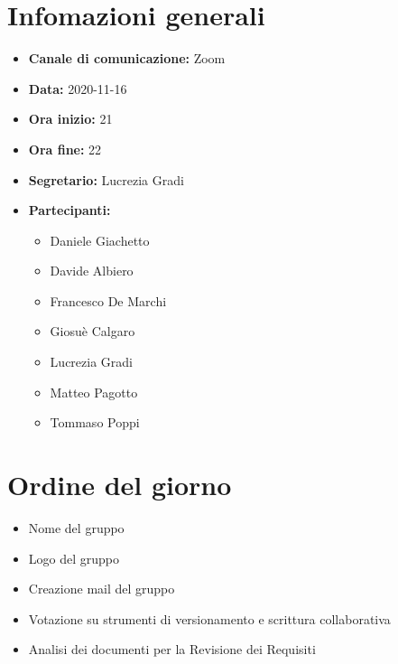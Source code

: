 \section{Infomazioni generali}

\begin{itemize}

	\item \textbf{Canale di comunicazione:} Zoom
	
	\item \textbf{Data:} 2020-11-16
	
	\item \textbf{Ora inizio:} 21
	
	\item \textbf{Ora fine:} 22
	
	\item \textbf{Segretario:} Lucrezia Gradi
	
	\item \textbf{Partecipanti:}
	
		\begin{itemize}
		
			\item Daniele Giachetto
			\item Davide Albiero
			\item Francesco De Marchi
			\item Giosuè Calgaro
			\item Lucrezia Gradi
			\item Matteo Pagotto
			\item Tommaso Poppi
				 
		\end{itemize}

\end{itemize}

\section{Ordine del giorno}

\begin{itemize}

	\item Nome del gruppo

	\item Logo del gruppo

	\item Creazione mail del gruppo

	\item Votazione su strumenti di versionamento e scrittura collaborativa
	
	\item Analisi dei documenti per la Revisione dei Requisiti


\end{itemize}

